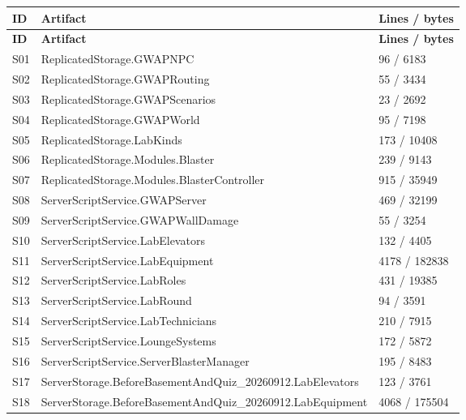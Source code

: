 \begin{longtable}{p{}p{}p{}}
\toprule
\textbf{ID} & \textbf{Artifact} & \textbf{Lines /\allowbreak{} bytes} \\ \midrule
\endfirsthead
\textbf{ID} & \textbf{Artifact} & \textbf{Lines /\allowbreak{} bytes} \\ \midrule
\endhead
S01 & ReplicatedStorage.\allowbreak{}GWAPNPC & 96 /\allowbreak{} 6183 \\
S02 & ReplicatedStorage.\allowbreak{}GWAPRouting & 55 /\allowbreak{} 3434 \\
S03 & ReplicatedStorage.\allowbreak{}GWAPScenarios & 23 /\allowbreak{} 2692 \\
S04 & ReplicatedStorage.\allowbreak{}GWAPWorld & 95 /\allowbreak{} 7198 \\
S05 & ReplicatedStorage.\allowbreak{}LabKinds & 173 /\allowbreak{} 10408 \\
S06 & ReplicatedStorage.\allowbreak{}Modules.\allowbreak{}Blaster & 239 /\allowbreak{} 9143 \\
S07 & ReplicatedStorage.\allowbreak{}Modules.\allowbreak{}BlasterController & 915 /\allowbreak{} 35949 \\
S08 & ServerScriptService.\allowbreak{}GWAPServer & 469 /\allowbreak{} 32199 \\
S09 & ServerScriptService.\allowbreak{}GWAPWallDamage & 55 /\allowbreak{} 3254 \\
S10 & ServerScriptService.\allowbreak{}LabElevators & 132 /\allowbreak{} 4405 \\
S11 & ServerScriptService.\allowbreak{}LabEquipment & 4178 /\allowbreak{} 182838 \\
S12 & ServerScriptService.\allowbreak{}LabRoles & 431 /\allowbreak{} 19385 \\
S13 & ServerScriptService.\allowbreak{}LabRound & 94 /\allowbreak{} 3591 \\
S14 & ServerScriptService.\allowbreak{}LabTechnicians & 210 /\allowbreak{} 7915 \\
S15 & ServerScriptService.\allowbreak{}LoungeSystems & 172 /\allowbreak{} 5872 \\
S16 & ServerScriptService.\allowbreak{}ServerBlasterManager & 195 /\allowbreak{} 8483 \\
S17 & ServerStorage.\allowbreak{}BeforeBasementAndQuiz\_\allowbreak{}20260912.\allowbreak{}LabElevators & 123 /\allowbreak{} 3761 \\
S18 & ServerStorage.\allowbreak{}BeforeBasementAndQuiz\_\allowbreak{}20260912.\allowbreak{}LabEquipment & 4068 /\allowbreak{} 175504 \\

\end{longtable}
